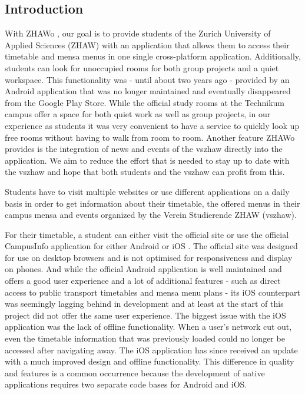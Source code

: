 \begin{markdown}
\section{Introduction} \label{introduction}

With ZHAWo \cite{OurHost}, our goal is to provide students of the Zurich University of Applied Sciences (ZHAW) with an application that allows them to access their timetable and mensa menus in one single cross-platform application. Additionally, students can look for unoccupied rooms for both group projects and a quiet workspace. This functionality was - until about two years ago - provided by an Android application that was no longer maintained and eventually disappeared from the Google Play Store. While the official study rooms at the Technikum campus offer a space for both quiet work as well as group projects, in our experience as students it was very convenient to have a service to quickly look up free rooms without having to walk from room to room. Another feature ZHAWo provides is the integration of news \cite{VszhawNews} and events \cite{VszhawCalendar} of the vszhaw directly into the application. We aim to reduce the effort that is needed to stay up to date with the vszhaw and hope that both students and the vszhaw can profit from this.

Students have to visit multiple websites or use different applications on a daily basis in order to get information about their timetable, the offered menus in their campus mensa and events organized by the Verein Studierende ZHAW (vszhaw).

For their timetable, a student can either visit the official site \cite{Stundenplan} or use the official CampusInfo application for either Android \cite{AppAndroid} or iOS \cite{AppIOS}. The official site was designed for use on desktop browsers and is not optimised for responsiveness and display on phones. And while the official Android application is well maintained and offers a good user experience and a lot of additional features - such as direct access to public transport timetables and mensa menu plans - its iOS counterpart was seemingly lagging behind in development and at least at the start of this project did not offer the same user experience. The biggest issue with the iOS application was the lack of offline functionality. When a user's network cut out, even the timetable information that was previously loaded could no longer be accessed after navigating away. The iOS application has since received an update with a much improved design and offline functionality. This difference in quality and features is a common occurrence because the development of native applications requires two separate code bases for Android and iOS. 


\end{markdown}
